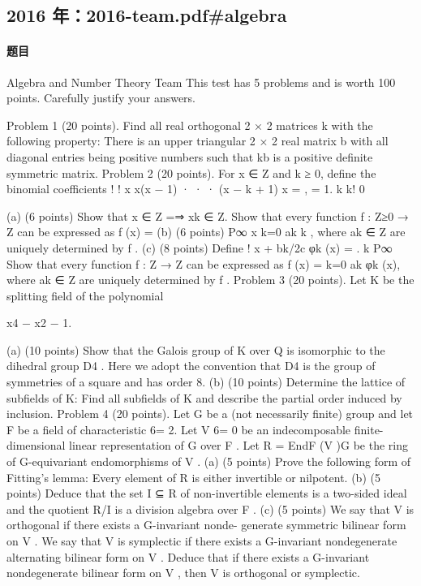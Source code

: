 \documentclass[UTF8,12pt]{ctexart}
\begin{document}
\subsection{2016 年：2016-team.pdf\#algebra}
\paragraph{题目}
Algebra and Number Theory Team This test has 5 problems and is worth 100 points. Carefully justify your answers.

Problem 1 (20 points). Find all real orthogonal 2 × 2 matrices k with the following property: There is an upper triangular 2 × 2 real matrix b with all diagonal entries being positive numbers such that kb is a positive definite symmetric matrix. Problem 2 (20 points). For x ∈ Z and k ≥ 0, define the binomial coefficients ! ! x x(x − 1) · · · (x − k + 1) x = , = 1. k k! 0

(a) (6 points) Show that x ∈ Z =⇒ xk ∈ Z. Show that every function f : Z≥0 → Z can be expressed as f (x) = (b) (6 points) P∞ x k=0 ak k , where ak ∈ Z are uniquely determined by f . (c) (8 points) Define ! x + bk/2c φk (x) = . k P∞ Show that every function f : Z → Z can be expressed as f (x) = k=0 ak φk (x), where ak ∈ Z are uniquely determined by f . Problem 3 (20 points). Let K be the splitting field of the polynomial

x4 − x2 − 1.

(a) (10 points) Show that the Galois group of K over Q is isomorphic to the dihedral group D4 . Here we adopt the convention that D4 is the group of symmetries of a square and has order 8. (b) (10 points) Determine the lattice of subfields of K: Find all subfields of K and describe the partial order induced by inclusion. Problem 4 (20 points). Let G be a (not necessarily finite) group and let F be a field of characteristic 6= 2. Let V 6= 0 be an indecomposable finite-dimensional linear representation of G over F . Let R = EndF (V )G be the ring of G-equivariant endomorphisms of V . (a) (5 points) Prove the following form of Fitting’s lemma: Every element of R is either invertible or nilpotent. (b) (5 points) Deduce that the set I ⊆ R of non-invertible elements is a two-sided ideal and the quotient R/I is a division algebra over F . (c) (5 points) We say that V is orthogonal if there exists a G-invariant nonde- generate symmetric bilinear form on V . We say that V is symplectic if there exists a G-invariant nondegenerate alternating bilinear form on V . Deduce that if there exists a G-invariant nondegenerate bilinear form on V , then V is orthogonal or symplectic.
\end{document}
